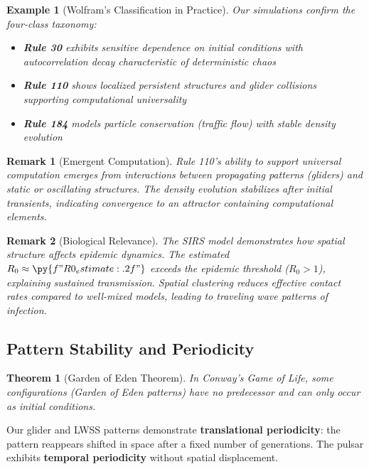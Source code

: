 \documentclass[a4paper, 11pt]{article}
\newtheorem{theorem}{Theorem}[section]
\newtheorem{example}{Example}[section]
\newtheorem{remark}{Remark}[section]
\begin{document}
\begin{example}[Wolfram's Classification in Practice]
Our simulations confirm the four-class taxonomy:
\begin{itemize}
\item \textbf{Rule 30} exhibits sensitive dependence on initial conditions with autocorrelation
decay characteristic of deterministic chaos
\item \textbf{Rule 110} shows localized persistent structures and glider collisions supporting
computational universality
\item \textbf{Rule 184} models particle conservation (traffic flow) with stable density evolution
\end{itemize}
\end{example}

\begin{remark}[Emergent Computation]
Rule 110's ability to support universal computation emerges from interactions between propagating
patterns (gliders) and static or oscillating structures. The density evolution stabilizes after
initial transients, indicating convergence to an attractor containing computational elements.
\end{remark}

\begin{remark}[Biological Relevance]
The SIRS model demonstrates how spatial structure affects epidemic dynamics. The estimated
$R_0 \approx \py{f"{R0_estimate:.2f}"}$ exceeds the epidemic threshold ($R_0 > 1$), explaining
sustained transmission. Spatial clustering reduces effective contact rates compared to
well-mixed models, leading to traveling wave patterns of infection.
\end{remark}

\subsection{Pattern Stability and Periodicity}

\begin{theorem}[Garden of Eden Theorem]
In Conway's Game of Life, some configurations (Garden of Eden patterns) have no predecessor
and can only occur as initial conditions.
\end{theorem}

Our glider and LWSS patterns demonstrate \textbf{translational periodicity}: the pattern
reappears shifted in space after a fixed number of generations. The pulsar exhibits
\textbf{temporal periodicity} without spatial displacement.
\end{document}
